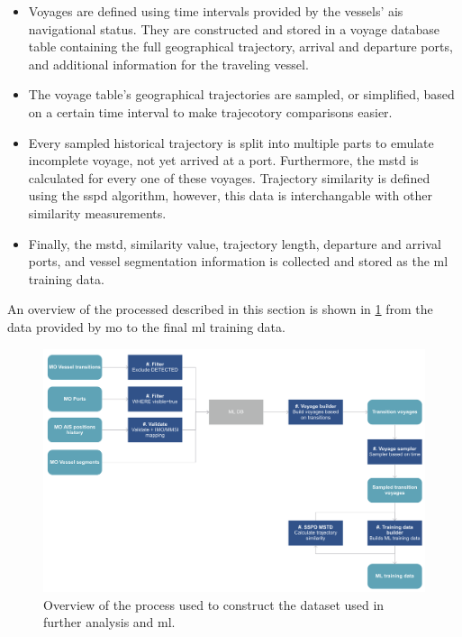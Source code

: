 \begin{itemize}
    \item Voyages are defined using time intervals provided by the vessels' \acrshort{ais} navigational status. They are constructed and stored in a voyage database table containing the full geographical trajectory, arrival and departure ports, and additional information for the traveling vessel.
    \item The voyage table's geographical trajectories are sampled, or simplified, based on a certain time interval to make trajecotory comparisons easier.
    \item Every sampled historical trajectory is split into multiple parts to emulate incomplete voyage, not yet arrived at a port. Furthermore, the \acrshort{mstd} is calculated for every one of these voyages. Trajectory similarity is defined using the \acrshort{sspd} algorithm, however, this data is interchangable with other similarity measurements.
    \item Finally, the \acrshort{mstd}, similarity value, trajectory length, departure and arrival ports, and vessel segmentation information is collected and stored as the \acrshort{ml} training data.
\end{itemize}

An overview of the processed described in this section is shown in \cref{fig:dataset_overview} from the data provided by \acrfull{mo} to the final \acrshort{ml} training data.

\begin{figure}[htbp]  %
    \centering
    \includegraphics[width=1.0\textwidth]{figures/dataset_overview}
    \caption{Overview of the process used to construct the dataset used in further analysis and \acrshort{ml}.}
    \label{fig:dataset_overview}
\end{figure}

